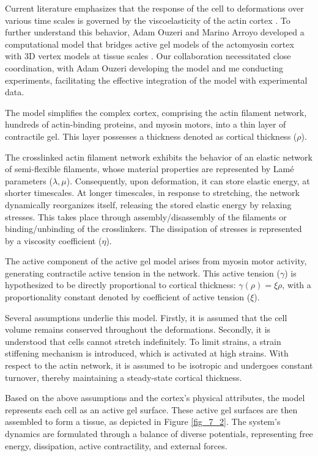 Current literature emphasizes that the response of the cell to deformations over various time scales is governed by the viscoelasticity of the actin cortex \cite{kelkar2020, clement2017, khalilgharibi2019}. To further understand this behavior, Adam Ouzeri and Marino Arroyo developed a computational model that bridges active gel models of the actomyosin cortex with 3D vertex models at tissue scales \cite{ouzeri2023}. Our collaboration necessitated close coordination, with Adam Ouzeri developing the model and me conducting experiments, facilitating the effective integration of the model with experimental data.

The model simplifies the complex cortex, comprising the actin filament network, hundreds of actin-binding proteins, and myosin motors, into a thin layer of contractile gel. This layer possesses a thickness denoted as cortical thickness (\(\rho\)).

The crosslinked actin filament network exhibits the behavior of an elastic network of semi-flexible filaments, whose material properties are represented by Lamé parameters  (\(\lambda,\mu\)). Consequently, upon deformation, it can store elastic energy, at shorter timescales. At longer timescales, in response to stretching, the network dynamically reorganizes itself, releasing the stored elastic energy by relaxing stresses. This takes place through assembly/disassembly of the filaments or binding/unbinding of the crosslinkers. The dissipation of stresses is represented by a viscosity coefficient (\(\eta\)).

The active component of the active gel model arises from myosin motor activity, generating contractile active tension in the network. This active tension (\(\gamma\)) is hypothesized to be directly proportional to cortical thickness:	$\gamma(\rho) = \xi \rho$, with a proportionality constant denoted by coefficient of active tension (\(\xi\)).

Several assumptions underlie this model. Firstly, it is assumed that the cell volume remains conserved throughout the deformations. Secondly, it is understood that cells cannot stretch indefinitely. To limit strains, a strain stiffening mechanism is introduced, which is activated at high strains. With respect to the actin network, it is assumed to be isotropic and undergoes constant turnover, thereby maintaining a steady-state cortical thickness.

Based on the above assumptions and the cortex’s physical attributes, the model represents each cell as an active gel surface. These active gel surfaces are then assembled to form a tissue, as depicted in Figure \ref{fig_7_2}. The system’s dynamics are formulated through a balance of diverse potentials, representing free energy, dissipation, active contractility, and external forces.

